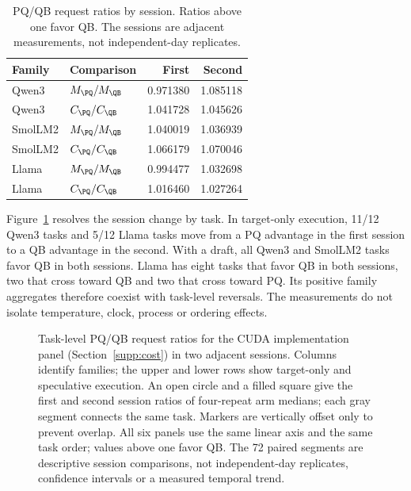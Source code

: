 \begin{table}[t]\centering\small
\caption{PQ/QB request ratios by session. Ratios above one favor QB. The sessions are adjacent measurements, not independent-day replicates.}
\label{tab:sessions}
\begin{tabular}{@{}llrr@{}}\toprule
Family & Comparison & First & Second\\\midrule
Qwen3 & $M_{\PQ}/M_{\QB}$ & 0.971380 & 1.085118 \\
Qwen3 & $C_{\PQ}/C_{\QB}$ & 1.041728 & 1.045626 \\\addlinespace[2pt]
SmolLM2 & $M_{\PQ}/M_{\QB}$ & 1.040019 & 1.036939 \\
SmolLM2 & $C_{\PQ}/C_{\QB}$ & 1.066179 & 1.070046 \\\addlinespace[2pt]
Llama & $M_{\PQ}/M_{\QB}$ & 0.994477 & 1.032698 \\
Llama & $C_{\PQ}/C_{\QB}$ & 1.016460 & 1.027264 \\
\bottomrule\end{tabular}
\end{table}

Figure~\ref{fig:sessiontasks} resolves the session change by task. In target-only execution, 11/12 Qwen3 tasks and 5/12 Llama tasks move from a PQ advantage in the first session to a QB advantage in the second. With a draft, all Qwen3 and SmolLM2 tasks favor QB in both sessions. Llama has eight tasks that favor QB in both sessions, two that cross toward QB and two that cross toward PQ. Its positive family aggregates therefore coexist with task-level reversals. The measurements do not isolate temperature, clock, process or ordering effects.

\begin{figure}[t]
\centering
\caption{Task-level PQ/QB request ratios for the CUDA implementation panel (Section~\ref{supp:cost}) in two adjacent sessions. Columns identify families; the upper and lower rows show target-only and speculative execution. An open circle and a filled square give the first and second session ratios of four-repeat arm medians; each gray segment connects the same task. Markers are vertically offset only to prevent overlap. All six panels use the same linear axis and the same task order; values above one favor QB. The 72 paired segments are descriptive session comparisons, not independent-day replicates, confidence intervals or a measured temporal trend.}
\label{fig:sessiontasks}
\end{figure}

